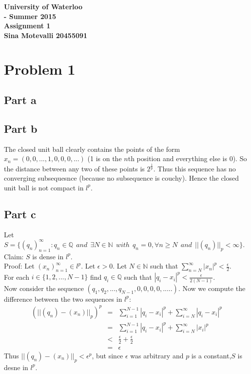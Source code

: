 \documentclass[12pt]{article}
\begin{document}
\begin{center}
  {\Large\bf University of Waterloo}\\
  \vspace{3mm}
         {\Large\bf  - Summer 2015}\\
         \vspace{2mm}
                {\Large\bf Assignment 1}\\
                \vspace{3mm}
                \textbf{Sina Motevalli 20455091}
\end{center}
\section*{Problem 1}
\subsection*{Part a}
\subsection*{Part b}
The closed unit ball clearly contains the points of the form
$x_n=(0,0,...,1,0,0,0,...)$ (1 is on the $n$th position and everything else is 0). 
So the distance between any two of these points is $2^{\frac{1}{p}}$. Thus this sequence has no converging subsequesnce (because no subsequence is couchy). Hence the closed unit ball is not compact in $l^p$.
\subsection*{Part c}
Let $S=\{(q_n)_{n=1}^{\infty} : q_n \in \mathbb{Q} \ \
and \ \ \exists N \in \mathbb{N} \ \ with \ \
q_n=0, \forall n \ge N \ \ and \ \
||(q_n)||_p < \infty\}$. \\
Claim: $S$ is dense in $l^p$.\\
Proof: Let $(x_n)_{n=1}^{\infty} \in l^p$. 
Let $\epsilon > 0$. Let $N \in \mathbb{N}$ such that
$\sum_{n=N}^{\infty} |x_n|^p < \frac{\epsilon}{2}$.
\\
For each $i \in \{1,2,...,N-1\}$ find $q_i \in \mathbb{Q}$ such that $|q_i-x_i|^p < \frac{\epsilon}{2(N-1)}$. \\
Now consider the sequence
$(q_1,q_2,...,q_{N-1},0,0,0,0,.....)$. Now we compute the difference between the two sequences in $l^p$:
\begin{eqnarray*}
(||(q_n)-(x_n)||_p)^p &=& 
\sum_{i=1}^{N-1} |q_i-x_i|^p + \sum_{i=N}^{\infty}
|q_i-x_i|^p
\\ &=&
\sum_{i=1}^{N-1} |q_i-x_i|^p + \sum_{i=N}^{\infty}
|x_i|^p
\\ & < &
\frac{\epsilon}{2} + \frac{\epsilon}{2}
\\ &=&
\epsilon
\end{eqnarray*}
Thus $||(q_n)-(x_n)||_p < \epsilon^p$, but since $\epsilon$ was arbitrary and $p$ is a constant,$S$ is desne in $l^p$.
\end{document}
